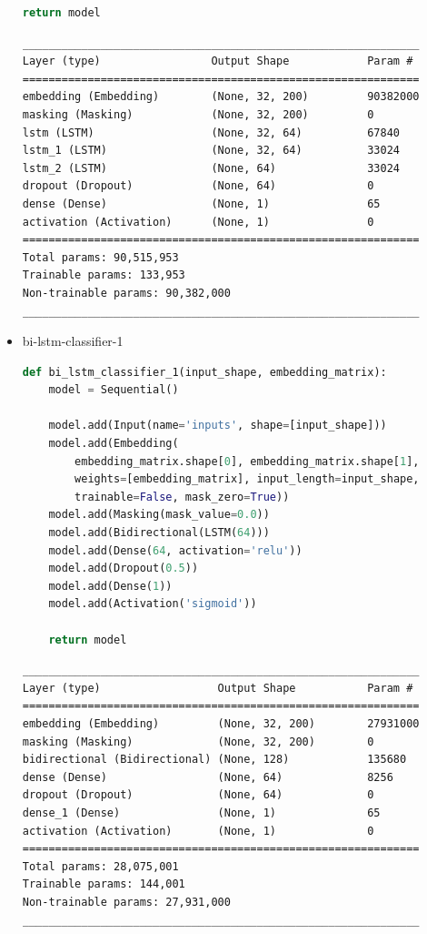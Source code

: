 \documentclass{article}
\begin{document}
\begin{itemize}
\begin{lstlisting}[language=Python, caption=Дефиниция на lstm-classifier-12.]
    return model
\end{lstlisting}

\begin{lstlisting}[numbers=none, caption=Обобщение на lstm-classifier-12.]
_____________________________________________________________
Layer (type)                 Output Shape            Param #
=============================================================
embedding (Embedding)        (None, 32, 200)         90382000
masking (Masking)            (None, 32, 200)         0
lstm (LSTM)                  (None, 32, 64)          67840
lstm_1 (LSTM)                (None, 32, 64)          33024
lstm_2 (LSTM)                (None, 64)              33024
dropout (Dropout)            (None, 64)              0
dense (Dense)                (None, 1)               65
activation (Activation)      (None, 1)               0
=============================================================
Total params: 90,515,953
Trainable params: 133,953
Non-trainable params: 90,382,000
_____________________________________________________________
\end{lstlisting}

  \item bi-lstm-classifier-1

\begin{lstlisting}[language=Python, caption=Дефиниция на bi-lstm-classifier-1.]
def bi_lstm_classifier_1(input_shape, embedding_matrix):
    model = Sequential()

    model.add(Input(name='inputs', shape=[input_shape]))
    model.add(Embedding(
        embedding_matrix.shape[0], embedding_matrix.shape[1],
        weights=[embedding_matrix], input_length=input_shape,
        trainable=False, mask_zero=True))
    model.add(Masking(mask_value=0.0))
    model.add(Bidirectional(LSTM(64)))
    model.add(Dense(64, activation='relu'))
    model.add(Dropout(0.5))
    model.add(Dense(1))
    model.add(Activation('sigmoid'))

    return model
\end{lstlisting}

\begin{lstlisting}[numbers=none, caption=Обобщение на bi-lstm-classifier-1.]
_____________________________________________________________
Layer (type)                  Output Shape           Param #
=============================================================
embedding (Embedding)         (None, 32, 200)        27931000
masking (Masking)             (None, 32, 200)        0
bidirectional (Bidirectional) (None, 128)            135680
dense (Dense)                 (None, 64)             8256
dropout (Dropout)             (None, 64)             0
dense_1 (Dense)               (None, 1)              65
activation (Activation)       (None, 1)              0
=============================================================
Total params: 28,075,001
Trainable params: 144,001
Non-trainable params: 27,931,000
_____________________________________________________________
\end{lstlisting}


\end{itemize}
\end{document}
